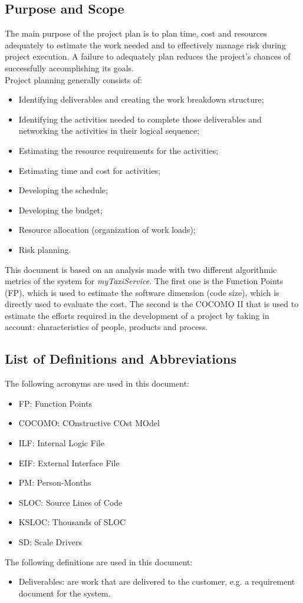 \documentclass[a4paper,11pt]{report} %
\newcommand{\mts}{\mbox{\normalfont\itshape myTaxiService}}
\begin{document}
		\subsection{Purpose and Scope}
			The main purpose of the project plan is to plan time, cost and resources adequately to estimate the work needed and to effectively manage risk during project execution. A failure to adequately plan reduces the project's chances of successfully accomplishing its goals.\smallskip\\
			Project planning generally consists of:
			\begin{itemize}
				\item Identifying deliverables and creating the work breakdown structure;
				\item Identifying the activities needed to complete those deliverables and networking the activities in their logical sequence;
				\item Estimating the resource requirements for the activities;
				\item Estimating time and cost for activities;
				\item Developing the schedule;
				\item Developing the budget;
				\item Resource allocation (organization of work loads);
				\item Risk planning.
			\end{itemize} 
			This document is based on an analysis made with two different algorithmic metrics of the system for \mts{}. The first one is the Function Points (FP), which is used to estimate the software dimension (code size), which is directly used to evaluate the cost. The second is the COCOMO II that is used to estimate the efforts required in the development of a project by taking in account: characteristics of people, products and process. 
			
		\subsection{List of Definitions and Abbreviations}
			The following acronyms are used in this document:
			\begin{itemize}
				\item FP: Function Points
				\item COCOMO: COnstructive COst MOdel
				\item ILF: Internal Logic File
				\item EIF: External Interface File
				\item PM: Person-Months
				\item SLOC: Source Lines of Code
				\item KSLOC: Thousands of SLOC
				\item SD: Scale Drivers
			\end{itemize}
			The following definitions are used in this document:
			\begin{itemize}
				\item Deliverables: are work that are delivered to the customer, e.g. a requirement document for the system.
			\end{itemize}
	
\end{document}
